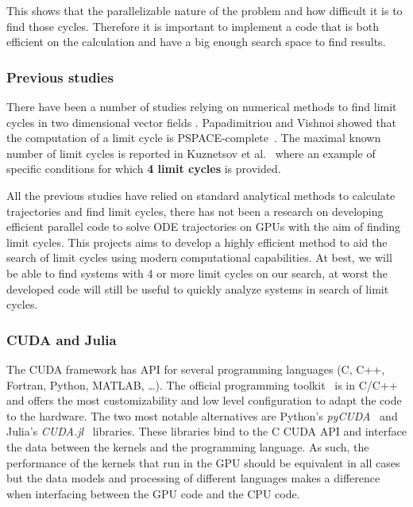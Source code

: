This shows that the parallelizable nature of the problem and how difficult it is
to find those cycles. Therefore it is important to implement a code that is both
efficient on the calculation and have a big enough search space to find results.

\subsubsection{Previous studies}

There have been a number of studies relying on numerical methods to find limit
cycles in two dimensional vector fields
\cite{leonov_hidden_2013,van_der_hoff_numerical_2013,casades_computation_2013,gasull_effective_2015}.
Papadimitriou and Vishnoi showed that the computation of a limit cycle is
PSPACE-complete~\cite{papadimitriou_computational_2015}.
The maximal known number of limit cycles is reported in Kuznetsov et
al.~\cite{kuznetsov_visualization_2013} where an example of specific conditions
for which \textbf{4 limit cycles} is provided.

All the previous studies have relied on standard analytical methods to calculate
trajectories and find limit cycles, there has not been a research on developing
efficient parallel code to solve ODE trajectories on GPUs with the aim of
finding limit cycles. This projects aims to develop a highly efficient method to
aid the search of limit cycles using modern computational capabilities. At best,
we will be able to find systems with 4 or more limit cycles on our search, at
worst the developed code will still be useful to quickly analyze systems in
search of limit cycles.

\pagebreak
\subsubsection{CUDA and Julia}

The CUDA framework has API for several programming languages (C, C++, Fortran,
Python, MATLAB, \dots). The official programming toolkit~\cite{nvidia_cuda_2021}
is in C/C++ and offers the most customizability and low level configuration to
adapt the code to the hardware. The two most notable alternatives are Python's
\emph{pyCUDA}~\cite{klockner_pycuda_2012} and Julia's
\emph{CUDA.jl}~\cite{besard_effective_2019} libraries. These libraries bind to
the C CUDA API and interface the data between the kernels and the programming
language. As such, the performance of the kernels that run in the GPU should be
equivalent in all cases but the data models and processing of different
languages makes a difference when interfacing between the GPU code and the CPU
code.

